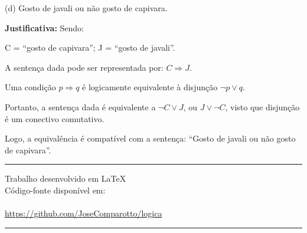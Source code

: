 \documentclass[12pt,letterpaper, onecolumn]{exam}
\begin{document}
\begin{questions}

    \begin{solution}
        (d) Gosto de javali ou não gosto de capivara.

        \textbf{Justificativa:} Sendo:
        
        C = “gosto de capivara”; \hfill
        J = “gosto de javali”.

        A sentença dada pode ser representada por: \( C \Rightarrow J\).
        
        Uma condição \( p \Rightarrow q \) é logicamente equivalente à disjunção \( \neg p \vee q \).

        Portanto, a sentença dada é equivalente a \( \neg C \vee J \), ou \( J \vee \neg C\), visto que disjunção é um conectivo comutativo.

        Logo, a equivalência é compatível com a sentença: “Gosto de javali ou não gosto de capivara”.
        \end{solution}
    
\end{questions}

\begingroup
    \pagebreak
    \centering

    \rule{\textwidth}{1pt}
    
    \vfill

    \LARGE{Trabalho desenvolvido em LaTeX} \\[1em]
    \large{Código-fonte disponível em:} \\[2em]
    
     \\[2em]

    \large \url{https://github.com/JoseComparotto/logica} 
    
    \vfill

    \rule{\textwidth}{1pt}
    
    \pagebreak

\endgroup
\end{document}
